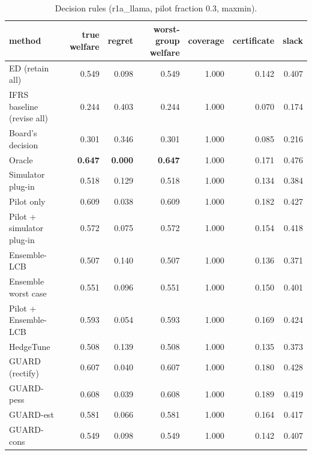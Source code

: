 \begin{table}[t]
\centering
\small
\begin{tabular}{lrrrrrr}
\toprule
method & true welfare & regret & worst-group welfare & coverage & certificate & slack \\
\midrule
ED (retain all) & 0.549 & 0.098 & 0.549 & 1.000 & 0.142 & 0.407 \\
IFRS baseline (revise all) & 0.244 & 0.403 & 0.244 & 1.000 & 0.070 & 0.174 \\
Board's decision & 0.301 & 0.346 & 0.301 & 1.000 & 0.085 & 0.216 \\
Oracle & \textbf{0.647} & \textbf{0.000} & \textbf{0.647} & 1.000 & 0.171 & 0.476 \\
Simulator plug-in & 0.518 & 0.129 & 0.518 & 1.000 & 0.134 & 0.384 \\
Pilot only & 0.609 & 0.038 & 0.609 & 1.000 & 0.182 & 0.427 \\
Pilot + simulator plug-in & 0.572 & 0.075 & 0.572 & 1.000 & 0.154 & 0.418 \\
Ensemble-LCB & 0.507 & 0.140 & 0.507 & 1.000 & 0.136 & 0.371 \\
Ensemble worst case & 0.551 & 0.096 & 0.551 & 1.000 & 0.150 & 0.401 \\
Pilot + Ensemble-LCB & 0.593 & 0.054 & 0.593 & 1.000 & 0.169 & 0.424 \\
HedgeTune & 0.508 & 0.139 & 0.508 & 1.000 & 0.135 & 0.373 \\
GUARD (rectify) & 0.607 & 0.040 & 0.607 & 1.000 & 0.180 & 0.428 \\
GUARD-pess & 0.608 & 0.039 & 0.608 & 1.000 & 0.189 & 0.419 \\
GUARD-est & 0.581 & 0.066 & 0.581 & 1.000 & 0.164 & 0.417 \\
GUARD-cons & 0.549 & 0.098 & 0.549 & 1.000 & 0.142 & 0.407 \\
\bottomrule
\end{tabular}
\caption{Decision rules (r1a\_llama, pilot fraction 0.3, maxmin).}
\label{tab:methods-maxmin}
\end{table}
